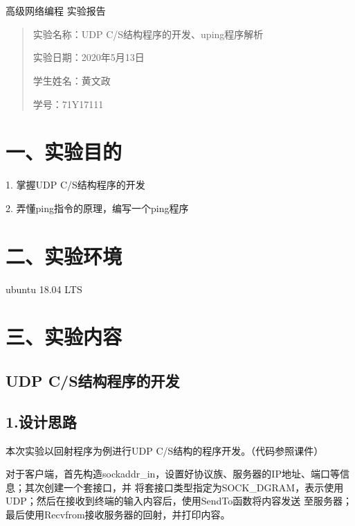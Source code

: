 \documentclass[UTF8]{ctexart}
\begin{document}
	\begin{center}
		\quad \\
		\quad \\
		\heiti \fontsize{45}{17} 高级网络编程
		\vskip 2.0cm
		\heiti \fontsize{39}{17} 实验报告	
	\end{center}
	\vskip 3.5cm
	\begin{quotation}
		\par\setlength\parindent{8.5em}
		\quad 
		\heiti 
		
		实验名称：UDP C/S结构程序的开发、uping程序解析
		
		实验日期：2020年5月13日
	
		学生姓名：黄文政
		
		学\hspace{0.72cm}号：71Y17111
		
		\vskip 2cm
		\centering
	\end{quotation}
	
\newpage
\songti \fontsize{13}{13}
\large
\section*{一、实验目的}

1. 掌握UDP C/S结构程序的开发

2. 弄懂ping指令的原理，编写一个ping程序

\section*{二、实验环境}
ubuntu 18.04 LTS

\section*{三、实验内容}
\subsection*{\textbf{UDP C/S结构程序的开发}}
\subsection*{1.设计思路}
本次实验以回射程序为例进行UDP C/S结构的程序开发。（代码参照课件）

对于客户端，首先构造sockaddr\_in，设置好协议族、服务器的IP地址、端口等信息；其次创建一个套接口，并
将套接口类型指定为SOCK\_DGRAM，表示使用UDP；然后在接收到终端的输入内容后，使用SendTo函数将内容发送
至服务器；最后使用Recvfrom接收服务器的回射，并打印内容。
\end{document}
